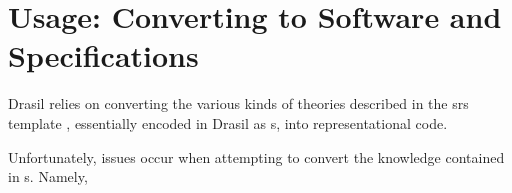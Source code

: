 \section{Usage: Converting to Software and Specifications}

Drasil relies on converting the various kinds of theories described in the
\acs{srs} template \cite{SmithAndLai2005}, essentially encoded in Drasil as
\RelationConcept{}s, into representational code.


Unfortunately, issues occur when attempting to convert the knowledge contained
in \RelationConcept{}s. Namely,



